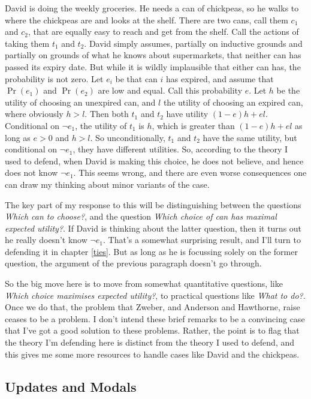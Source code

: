 \documentclass[11pt,]{book}
\begin{document}
David is doing the weekly groceries. He needs a can of chickpeas, so he walks to where the chickpeas are and looks at the shelf. There are two cans, call them \(c_1\) and \(c_2\), that are equally easy to reach and get from the shelf. Call the actions of taking them \(t_1\) and \(t_2\). David simply assumes, partially on inductive grounds and partially on grounds of what he knows about supermarkets, that neither can has passed its expiry date. But while it is wildly implausible that either can has, the probability is not zero. Let \(e_i\) be that can \(i\) has expired, and assume that \(\Pr(e_1)\) and \(\Pr(e_2)\) are low and equal. Call this probability \(e\). Let \(h\) be the utility of choosing an unexpired can, and \(l\) the utility of choosing an expired can, where obviously \(h > l\). Then both \(t_1\) and \(t_2\) have utility \((1-e)h + el\). Conditional on \(\neg e_1\), the utility of \(t_1\) is \(h\), which is greater than \((1-e)h + el\) as long as \(e > 0\) and \(h > l\). So unconditionally, \(t_1\) and \(t_2\) have the same utility, but conditional on \(\neg e_1\), they have different utilities. So, according to the theory I used to defend, when David is making this choice, he does not believe, and hence does not know \(\neg e_1\). This seems wrong, and there are even worse consequences one can draw my thinking about minor variants of the case.

The key part of my response to this will be distinguishing between the questions \emph{Which can to choose?}, and the question \emph{Which choice of can has maximal expected utility?}. If David is thinking about the latter question, then it turns out he really doesn't know \(\neg e_1\). That's a somewhat surprising result, and I'll turn to defending it in chapter \ref{ties}. But as long as he is focussing solely on the former question, the argument of the previous paragraph doesn't go through.

So the big move here is to move from somewhat quantitative questions, like \emph{Which choice maximises expected utility?}, to practical questions like \emph{What to do?}. Once we do that, the problem that Zweber, and Anderson and Hawthorne, raise ceases to be a problem. I don't intend these brief remarks to be a convincing case that I've got a good solution to these problems. Rather, the point is to flag that the theory I'm defending here is distinct from the theory I used to defend, and this gives me some more resources to handle cases like David and the chickpeas.

\hypertarget{modalupdate}{%
\subsection{Updates and Modals}\label{modalupdate}}
\end{document}
